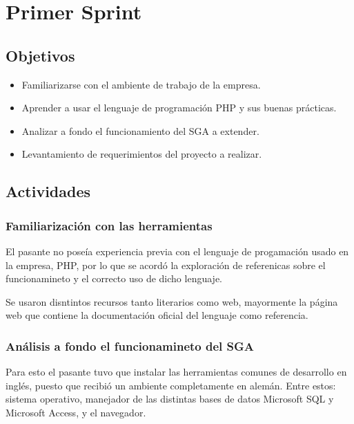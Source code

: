 \section{Primer Sprint} %
\label{sec:primer_sprint}

\subsection{Objetivos}

\begin{itemize}
	\item Familiarizarse con el ambiente de trabajo de la empresa.
	\item Aprender a usar el lenguaje de programación PHP y sus buenas prácticas.
	\item Analizar a fondo el funcionamiento del SGA a extender.
	\item Levantamiento de requerimientos del proyecto a realizar.
\end{itemize}

\subsection{Actividades} %
\label{sub:actividades1}

\subsubsection{Familiarización con las herramientas}

El pasante no poseía experiencia previa con el lenguaje de progamación usado en la empresa, PHP, por lo que se acordó la exploración de referenicas sobre el funcionamineto y el correcto uso de dicho lenguaje.

Se usaron disntintos recursos tanto literarios como web, mayormente la página web que contiene la documentación oficial del lenguaje como referencia.

\subsubsection{Análisis a fondo el funcionamineto del SGA}

Para esto el pasante tuvo que instalar las herramientas comunes de desarrollo en inglés, puesto que recibió un ambiente completamente en alemán. Entre estos: sistema operativo, manejador de las distintas bases de datos Microsoft SQL y Microsoft Access, y el navegador.

